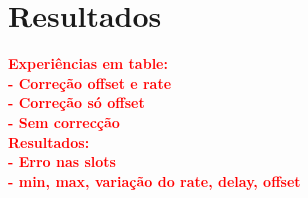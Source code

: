 \section{Resultados} \label{sec:resultados}

\textcolor{red}{\textbf{Experiências em table: \\
    - Correção offset e rate\\
    - Correção só offset\\
    - Sem correcção\\
Resultados: \\
    - Erro nas slots \\
    - min, max, variação do rate, delay, offset}}